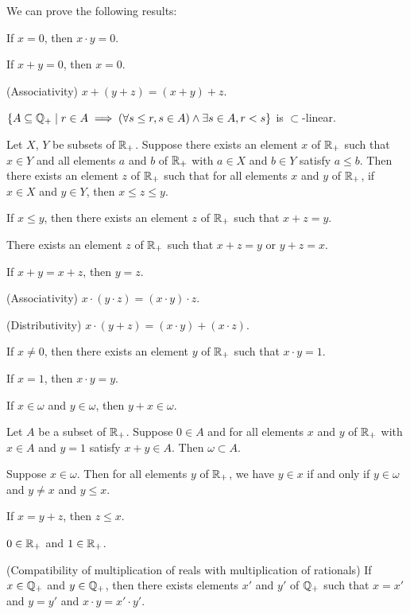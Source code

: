 \documentclass{article}
\begin{document}
We can prove the following results:
\begin{thm}
\item\label{arytm2:4} If $x=0$, then $x\cdot y=0$.
\item\label{arytm2:5} If $x+y=0$, then $x=0$.
\item\label{arytm2:6} (Associativity) $x+(y+z)=(x+y)+z$.
\item\label{arytm2:7} $\{A\subseteq\mathbb{Q}_{+}\mid r\in A\implies(\forall s\leq r,s\in A)\land\exists s\in A,r<s\}$
  is $\subset$-linear.
\item\label{arytm2:8} Let $X$, $Y$ be subsets of $\mathbb{R}_{+}$.
Suppose there exists an element $x$ of $\mathbb{R}_{+}$ such that $x\in Y$ and
all elements $a$ and $b$ of $\mathbb{R}_{+}$ with $a\in X$ and $b\in Y$ satisfy
$a\leq b$.
Then there exists an element $z$ of $\mathbb{R}_{+}$
such that for all elements $x$ and $y$ of $\mathbb{R}_{+}$, if $x\in X$ and
$y\in Y$, then $x\leq z\leq y$.
\item\label{arytm2:9} If $x\leq y$, then there exists an element $z$ of
  $\mathbb{R}_{+}$ such that $x+z=y$.
\item\label{arytm2:10} There exists an element $z$ of $\mathbb{R}_{+}$ such
  that $x+z=y$ or $y+z=x$.
\item\label{arytm2:11} If $x+y=x+z$, then $y=z$.
\item\label{arytm2:12} (Associativity) $x\cdot(y\cdot z)=(x\cdot y)\cdot z$.
\item\label{arytm2:13} (Distributivity) $x\cdot(y+z)=(x\cdot y)+(x\cdot z)$.
\item\label{arytm2:14} If $x\neq0$, then there exists an element $y$ of
  $\mathbb{R}_{+}$ such that $x\cdot y=1$.
\item\label{arytm2:15} If $x=1$, then $x\cdot y=y$.
\item\label{arytm2:16} If $x\in\omega$ and $y\in\omega$, then $y+x\in\omega$.
\item\label{arytm2:17} Let $A$ be a subset of $\mathbb{R}_{+}$.
  Suppose $0\in A$ and for all elements $x$ and $y$ of $\mathbb{R}_{+}$ with
  $x\in A$ and $y=1$ satisfy $x+y\in A$.
  Then $\omega\subset A$.
\item\label{arytm2:18} Suppose $x\in\omega$.
  Then for all elements $y$ of $\mathbb{R}_{+}$, we have $y\in x$ if and only
  if $y\in\omega$ and $y\neq x$ and $y\leq x$.
\item\label{arytm2:19} If $x=y+z$, then $z\leq x$.
\item\label{arytm2:20} $0\in\mathbb{R}_{+}$ and $1\in\mathbb{R}_{+}$.
\item\label{arytm2:21} (Compatibility of multiplication of reals with
  multiplication of rationals) If $x\in\mathbb{Q}_{+}$ and $y\in\mathbb{Q}_{+}$, then there
  exists elements $x'$ and $y'$ of $\mathbb{Q}_{+}$ such that $x=x'$ and $y=y'$
  and $x\cdot y=x'\cdot y'$.
\end{thm}
\end{document}
